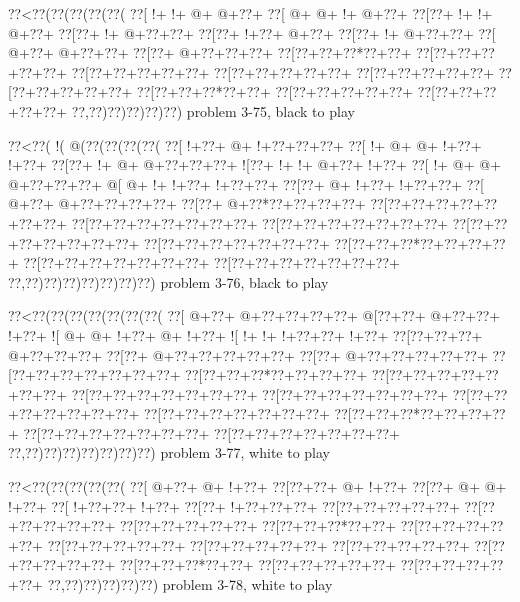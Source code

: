 \vbox{\vbox{\goo
\0??<\0??(\0??(\0??(\0??(\0??(
\0??[\- !+\- !+\- @+\- @+\0??+
\0??[\- @+\- @+\- !+\- @+\0??+
\0??[\0??+\- !+\- !+\- @+\0??+
\0??[\0??+\- !+\- @+\0??+\0??+
\0??[\0??+\- !+\0??+\- @+\0??+
\0??[\0??+\- !+\- @+\0??+\0??+
\0??[\- @+\0??+\- @+\0??+\0??+
\0??[\0??+\- @+\0??+\0??+\0??+
\0??[\0??+\0??+\0??*\0??+\0??+
\0??[\0??+\0??+\0??+\0??+\0??+
\0??[\0??+\0??+\0??+\0??+\0??+
\0??[\0??+\0??+\0??+\0??+\0??+
\0??[\0??+\0??+\0??+\0??+\0??+
\0??[\0??+\0??+\0??+\0??+\0??+
\0??[\0??+\0??+\0??*\0??+\0??+
\0??[\0??+\0??+\0??+\0??+\0??+
\0??[\0??+\0??+\0??+\0??+\0??+
\0??,\0??)\0??)\0??)\0??)\0??)
}
\hfil problem 3-75, black to play\hfil\break
}

\vbox{\vbox{\goo
\0??<\0??(\- !(\- @(\0??(\0??(\0??(\0??(
\0??[\- !+\0??+\- @+\- !+\0??+\0??+\0??+
\0??[\- !+\- @+\- @+\- !+\0??+\- !+\0??+
\0??[\0??+\- !+\- @+\- @+\0??+\0??+\0??+
\- ![\0??+\- !+\- !+\- @+\0??+\- !+\0??+
\0??[\- !+\- @+\- @+\- @+\0??+\0??+\0??+
\- @[\- @+\- !+\- !+\0??+\- !+\0??+\0??+
\0??[\0??+\- @+\- !+\0??+\- !+\0??+\0??+
\0??[\- @+\0??+\- @+\0??+\0??+\0??+\0??+
\0??[\0??+\- @+\0??*\0??+\0??+\0??+\0??+
\0??[\0??+\0??+\0??+\0??+\0??+\0??+\0??+
\0??[\0??+\0??+\0??+\0??+\0??+\0??+\0??+
\0??[\0??+\0??+\0??+\0??+\0??+\0??+\0??+
\0??[\0??+\0??+\0??+\0??+\0??+\0??+\0??+
\0??[\0??+\0??+\0??+\0??+\0??+\0??+\0??+
\0??[\0??+\0??+\0??*\0??+\0??+\0??+\0??+
\0??[\0??+\0??+\0??+\0??+\0??+\0??+\0??+
\0??[\0??+\0??+\0??+\0??+\0??+\0??+\0??+
\0??,\0??)\0??)\0??)\0??)\0??)\0??)\0??)
}
\hfil problem 3-76, black to play\hfil\break
}

\vbox{\vbox{\goo
\0??<\0??(\0??(\0??(\0??(\0??(\0??(\0??(
\0??[\- @+\0??+\- @+\0??+\0??+\0??+\0??+
\- @[\0??+\0??+\- @+\0??+\0??+\- !+\0??+
\- ![\- @+\- @+\- !+\0??+\- @+\- !+\0??+
\- ![\- !+\- !+\- !+\0??+\0??+\- !+\0??+
\0??[\0??+\0??+\0??+\- @+\0??+\0??+\0??+
\0??[\0??+\- @+\0??+\0??+\0??+\0??+\0??+
\0??[\0??+\- @+\0??+\0??+\0??+\0??+\0??+
\0??[\0??+\0??+\0??+\0??+\0??+\0??+\0??+
\0??[\0??+\0??+\0??*\0??+\0??+\0??+\0??+
\0??[\0??+\0??+\0??+\0??+\0??+\0??+\0??+
\0??[\0??+\0??+\0??+\0??+\0??+\0??+\0??+
\0??[\0??+\0??+\0??+\0??+\0??+\0??+\0??+
\0??[\0??+\0??+\0??+\0??+\0??+\0??+\0??+
\0??[\0??+\0??+\0??+\0??+\0??+\0??+\0??+
\0??[\0??+\0??+\0??*\0??+\0??+\0??+\0??+
\0??[\0??+\0??+\0??+\0??+\0??+\0??+\0??+
\0??[\0??+\0??+\0??+\0??+\0??+\0??+\0??+
\0??,\0??)\0??)\0??)\0??)\0??)\0??)\0??)
}
\hfil problem 3-77, white to play\hfil\break
}

\vbox{\vbox{\goo
\0??<\0??(\0??(\0??(\0??(\0??(
\0??[\- @+\0??+\- @+\- !+\0??+
\0??[\0??+\0??+\- @+\- !+\0??+
\0??[\0??+\- @+\- @+\- !+\0??+
\0??[\- !+\0??+\0??+\- !+\0??+
\0??[\0??+\- !+\0??+\0??+\0??+
\0??[\0??+\0??+\0??+\0??+\0??+
\0??[\0??+\0??+\0??+\0??+\0??+
\0??[\0??+\0??+\0??+\0??+\0??+
\0??[\0??+\0??+\0??*\0??+\0??+
\0??[\0??+\0??+\0??+\0??+\0??+
\0??[\0??+\0??+\0??+\0??+\0??+
\0??[\0??+\0??+\0??+\0??+\0??+
\0??[\0??+\0??+\0??+\0??+\0??+
\0??[\0??+\0??+\0??+\0??+\0??+
\0??[\0??+\0??+\0??*\0??+\0??+
\0??[\0??+\0??+\0??+\0??+\0??+
\0??[\0??+\0??+\0??+\0??+\0??+
\0??,\0??)\0??)\0??)\0??)\0??)
}
\hfil problem 3-78, white to play\hfil\break
}

